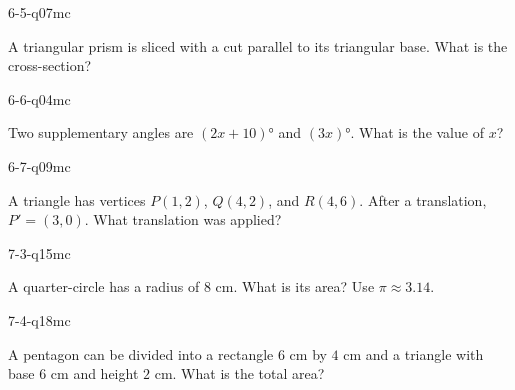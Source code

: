 \begin{practiceQuestion}{6-5-q07}{mc}
\begin{questionText}
A triangular prism is sliced with a cut parallel to its triangular base. What is the cross-section?
\end{questionText}
\end{practiceQuestion}

\begin{practiceQuestion}{6-6-q04}{mc}
\begin{questionText}
Two supplementary angles are $(2x + 10)°$ and $(3x)°$. What is the value of $x$?
\end{questionText}
\end{practiceQuestion}

\begin{practiceQuestion}{6-7-q09}{mc}
\begin{questionText}
A triangle has vertices $P(1, 2)$, $Q(4, 2)$, and $R(4, 6)$. After a translation, $P' = (3, 0)$. What translation was applied?
\end{questionText}
\end{practiceQuestion}

\begin{practiceQuestion}{7-3-q15}{mc}
\begin{questionText}
A quarter-circle has a radius of $8$ cm. What is its area? Use $\pi \approx 3.14$.
\end{questionText}
\end{practiceQuestion}

\begin{practiceQuestion}{7-4-q18}{mc}
\begin{questionText}
A pentagon can be divided into a rectangle $6$ cm by $4$ cm and a triangle with base $6$ cm and height $2$ cm. What is the total area?
\end{questionText}
\end{practiceQuestion}

